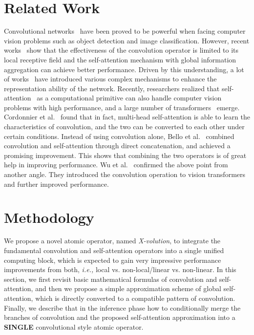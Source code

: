 \documentclass{article}
\begin{document}
\section{Related Work}
Convolutional networks~\cite{DBLP:journals/corr/SimonyanZ14a,DBLP:conf/cvpr/HeZRS16,DBLP:conf/cvpr/SzegedyVISW16} have been proved to be powerful when facing computer vision problems such as object detection and image classification.
However, recent works~\cite{DBLP:conf/cvpr/0004GGH18} show that the effectiveness of the convolution operator is limited to its local receptive field and the self-attention mechanism with global information aggregation can achieve better performance.
Driven by this understanding, a lot of works~\cite{DBLP:conf/cvpr/0004GGH18,DBLP:conf/cvpr/HuSS18,DBLP:conf/cvpr/WangWZLZH20,DBLP:conf/eccv/WooPLK18} have introduced various complex mechanisms to enhance the representation ability of the network.
Recently, researchers realized that self-attention~\cite{DBLP:conf/nips/VaswaniSPUJGKP17} as a computational primitive can also handle computer vision problems with high performance, and a large number of transformers~\cite{DBLP:journals/corr/abs-2103-12731,DBLP:journals/corr/abs-2103-14030,DBLP:journals/corr/abs-2010-04159,DBLP:conf/eccv/CarionMSUKZ20,DBLP:journals/corr/abs-2101-11605,DBLP:journals/corr/abs-2103-15436,DBLP:journals/corr/abs-2103-16553,DBLP:journals/corr/abs-2012-09760} emerge.
Cordonnier et al.~\cite{DBLP:conf/iclr/CordonnierLJ20} found that in fact, multi-head self-attention 
is able to learn the characteristics of convolution, and the two can be converted to each other under certain conditions.
Instead of using convolution alone, Bello et al.~\cite{DBLP:conf/iccv/BelloZLVS19} combined convolution and self-attention through direct concatenation, and achieved a promising improvement.
This shows that combining the two operators is of great help in improving performance.
Wu et al.~\cite{DBLP:journals/corr/abs-2103-15808} confirmed the above point from another angle.
They introduced the convolution operation to vision transformers and further improved performance.







\section{Methodology}
We propose a novel atomic operator, named \emph{X-volution}, to integrate the fundamental convolution and self-attention operators into a single unified computing block, which is expected to gain very impressive performance improvements from both, \emph{i.e.,} local vs. non-local/linear vs. non-linear. In this section, we first revisit basic mathematical formulas of convolution and self-attention, and then we propose a simple approximation scheme of global self-attention, which is directly converted to a compatible pattern of convolution.
Finally, we describe that in the inference phase how to conditionally merge the branches of convolution and the proposed self-attention approximation into a \textbf{SINGLE} convolutional style atomic operator.
\end{document}

